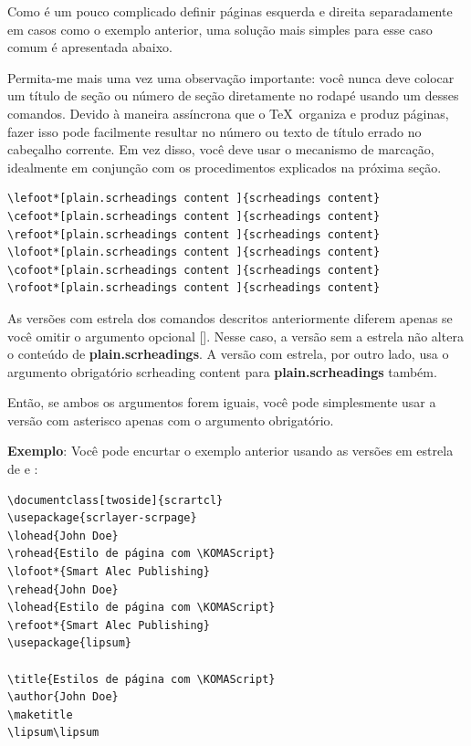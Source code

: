 Como é um pouco complicado definir páginas esquerda e direita separadamente em casos como o exemplo anterior, uma solução mais simples para esse caso comum é apresentada abaixo.

Permita-me mais uma vez uma observação importante: você nunca deve colocar um título de seção ou número de seção diretamente no rodapé usando um desses comandos. Devido à maneira assíncrona que o \TeX\ organiza e produz páginas, fazer isso pode facilmente resultar no número ou texto de título errado no cabeçalho corrente. Em vez disso, você deve usar o mecanismo de marcação, idealmente em conjunção com os procedimentos explicados na próxima seção.
\begin{verbatim}
\lefoot*[plain.scrheadings content ]{scrheadings content}
\cefoot*[plain.scrheadings content ]{scrheadings content}
\refoot*[plain.scrheadings content ]{scrheadings content}
\lofoot*[plain.scrheadings content ]{scrheadings content}
\cofoot*[plain.scrheadings content ]{scrheadings content}
\rofoot*[plain.scrheadings content ]{scrheadings content}  
\end{verbatim}

As versões com estrela dos comandos descritos anteriormente diferem apenas se você omitir o argumento opcional []. Nesse caso, a versão sem a estrela não altera o conteúdo de \textbf{plain.scrheadings}. A versão com estrela, por outro lado, usa o argumento obrigatório scrheading content para \textbf{plain.scrheadings} também.

Então, se ambos os argumentos forem iguais, você pode simplesmente usar a versão com asterisco apenas com o argumento obrigatório.

\textbf{Exemplo}: Você pode encurtar o exemplo anterior usando as versões em estrela de  e :
\begin{verbatim}
\documentclass[twoside]{scrartcl}
\usepackage{scrlayer-scrpage}
\lohead{John Doe}
\rohead{Estilo de página com \KOMAScript}
\lofoot*{Smart Alec Publishing}
\rehead{John Doe}
\lohead{Estilo de página com \KOMAScript}
\refoot*{Smart Alec Publishing}
\usepackage{lipsum}

\title{Estilos de página com \KOMAScript}
\author{John Doe}
\maketitle
\lipsum\lipsum
 
\end{verbatim}

